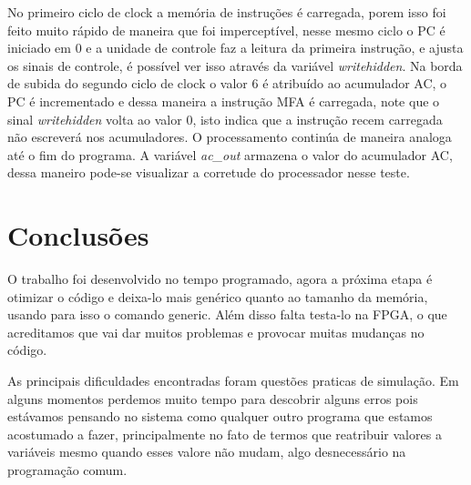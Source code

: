 \documentclass[12pt]{article}
\begin{document}
No primeiro ciclo de clock a memória de instruções é carregada, porem isso foi feito muito rápido de maneira que foi imperceptível, nesse mesmo ciclo o PC é iniciado em 0 e a unidade de controle faz a leitura da primeira instrução, e ajusta os sinais de controle, é possível ver isso através da variável \textit{writehidden}.
Na borda de subida do segundo ciclo de clock o valor 6 é atribuído ao acumulador AC, o PC é incrementado e dessa maneira a instrução MFA é carregada, note que o sinal \textit{writehidden} volta ao valor 0, isto indica que a instrução recem carregada não escreverá nos acumuladores.
O processamento continúa de maneira analoga até o fim do programa. A variável \textit{ac\_out} armazena o valor do acumulador AC, dessa maneiro pode-se visualizar a corretude do processador nesse teste.

\section{Conclusões}

O trabalho foi desenvolvido no tempo programado, agora a próxima etapa é otimizar o código e deixa-lo mais genérico quanto ao tamanho da memória, usando para isso o comando generic. Além disso falta testa-lo na FPGA, o que acreditamos que vai dar muitos problemas e provocar muitas mudanças no código.

As principais dificuldades encontradas foram questões praticas de simulação. Em alguns momentos perdemos muito tempo para descobrir alguns erros pois estávamos pensando no sistema como qualquer outro programa que estamos acostumado a fazer, principalmente no fato de termos que reatribuir valores a variáveis mesmo quando esses valore não mudam, algo desnecessário na programação comum.



%
%
\end{document}
